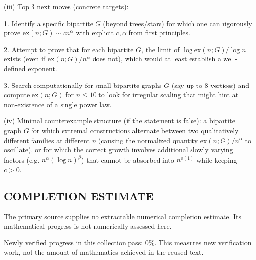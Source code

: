(iii) Top 3 next moves (concrete targets):

1. Identify a specific bipartite $G$ (beyond trees/stars) for which one can rigorously prove $\mathrm{ex}(n;G)\sim c n^{\alpha}$ with explicit $c,\alpha$ from first principles.

2. Attempt to prove that for each bipartite $G$, the limit of $\log \mathrm{ex}(n;G)/\log n$ exists (even if $\mathrm{ex}(n;G)/n^{\alpha}$ does not), which would at least establish a well-defined exponent.

3. Search computationally for small bipartite graphs $G$ (say up to 8 vertices) and compute $\mathrm{ex}(n;G)$ for $n\le 10$ to look for irregular scaling that might hint at non-existence of a single power law.

(iv) Minimal counterexample structure (if the statement is false): a bipartite graph $G$ for which extremal constructions alternate between two qualitatively different families at different $n$ (causing the normalized quantity $\mathrm{ex}(n;G)/n^{\alpha}$ to oscillate), or for which the correct growth involves additional slowly varying factors (e.g. $n^{\alpha}(\log n)^{\beta}$) that cannot be absorbed into $n^{o(1)}$ while keeping $c>0$.




\subsection*{COMPLETION ESTIMATE}
The primary source supplies no extractable numerical completion estimate. Its mathematical progress is not numerically assessed here.

Newly verified progress in this collection pass: $0\%$. This measures new verification work, not the amount of mathematics achieved in the reused text.

